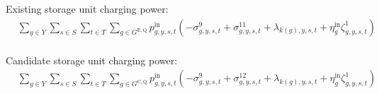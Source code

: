 \documentclass{article}
\newcommand{\sStorageExisting}{G^{\mathrm{E,Q}}}
\newcommand{\sStorageCandidate}{G^{\mathrm{C,Q}}}
\newcommand{\sYears}{Y}
\newcommand{\sScenarios}{S}
\newcommand{\sIntervals}{T}
\newcommand{\iGenerator}{g}
\newcommand{\iYear}{y}
\newcommand{\iScenario}{s}
\newcommand{\iInterval}{t}
\newcommand{\iIntervalTerminal}{\overline{\iInterval}}
\newcommand{\iZone}{z}
\newcommand{\cStorageUnitEfficiencyCharging}{\eta_{\iGenerator}^{\mathrm{in}}}
\newcommand{\vPowerIn}[1][\iGenerator,\iYear,\iScenario,\iInterval]{p^{\mathrm{in}}_{#1}}
\newcommand{\dNonNegativeCharging}[1][\iGenerator,\iYear,\iScenario,\iInterval]{\sigma_{#1}^{9}}
\newcommand{\dMaxChargingRateExisting}[1][\iGenerator,\iYear,\iScenario,\iInterval]{\sigma_{#1}^{11}}
\newcommand{\dMaxChargingRateCandidate}[1][\iGenerator,\iYear,\iScenario,\iInterval]{\sigma_{#1}^{12}}
\newcommand{\dRampRateUpStorageCharging}[1][\iGenerator,\iYear,\iScenario,\iInterval]{\sigma_{#1}^{21}}
\newcommand{\dRampRateDownStorageCharging}[1][\iGenerator,\iYear,\iScenario,\iInterval]{\sigma_{#1}^{24}}
\newcommand{\dPowerBalance}[1][\iZone,\iYear,\iScenario,\iInterval]{\lambda_{#1}}
\newcommand{\dStorageEnergyTransition}[1][\iGenerator,\iYear,\iScenario,\iInterval]{\zeta_{#1}^{1}}
\begin{document}
Existing storage unit charging power:
\begin{align}
	& \sum\limits_{\iYear \in \sYears} \sum\limits_{\iScenario \in \sScenarios} \sum\limits_{\iInterval \in \sIntervals 
	} \sum\limits_{\iGenerator \in \sStorageExisting} \vPowerIn \left( - \dNonNegativeCharging + \dMaxChargingRateExisting + \dPowerBalance[k(\iGenerator),\iYear,\iScenario,\iInterval] + \cStorageUnitEfficiencyCharging\dStorageEnergyTransition 
	 \right) \nonumber\\
\end{align}

Candidate storage unit charging power:
\begin{align}
	& \sum\limits_{\iYear \in \sYears} \sum\limits_{\iScenario \in \sScenarios} \sum\limits_{\iInterval \in \sIntervals 
	} \sum\limits_{\iGenerator \in \sStorageCandidate} \vPowerIn \left( - \dNonNegativeCharging + \dMaxChargingRateCandidate + \dPowerBalance[k(\iGenerator),\iYear,\iScenario,\iInterval] + \cStorageUnitEfficiencyCharging\dStorageEnergyTransition
	\right)\nonumber\\
\end{align}
\end{document}

